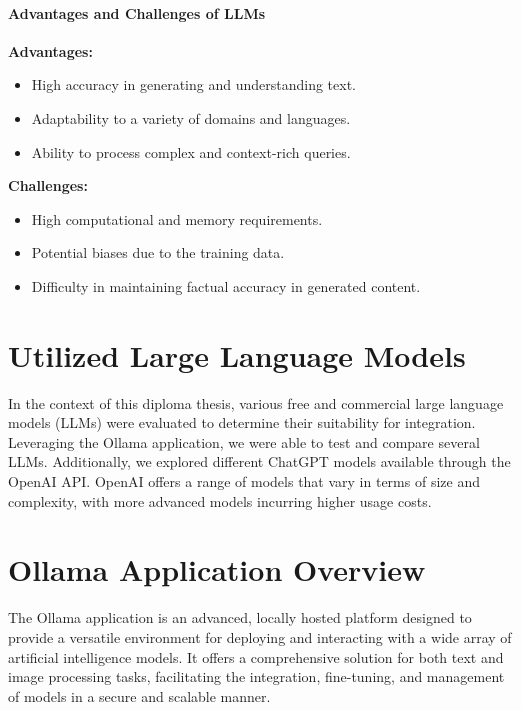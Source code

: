 \paragraph{Advantages and Challenges of LLMs}

\textbf{Advantages:}
\begin{itemize}
\item High accuracy in generating and understanding text.
\item Adaptability to a variety of domains and languages.
\item Ability to process complex and context-rich queries.
\end{itemize}

\textbf{Challenges:}
\begin{itemize}
\item High computational and memory requirements.
\item Potential biases due to the training data.
\item Difficulty in maintaining factual accuracy in generated content.
\end{itemize}

\cite{what-are-LLMs-IBM}

\section{Utilized Large Language Models}

In the context of this diploma thesis, various free and commercial large language models (LLMs) 
were evaluated to determine their suitability for integration. Leveraging the Ollama application, we were able to test and compare several LLMs. 
Additionally, we explored different ChatGPT models available through the OpenAI API.
OpenAI offers a range of models that vary in terms of size and complexity, with more advanced models incurring higher usage costs.
\cite{OpenAI_API_overview}


\section{Ollama Application Overview}

The Ollama application is an advanced, locally hosted platform designed to provide a versatile environment for deploying and interacting with a wide array of artificial intelligence models. It offers a comprehensive solution for both text and image processing tasks, facilitating the integration, fine-tuning, and management of models in a secure and scalable manner.
\cite{WhatisOllama}

